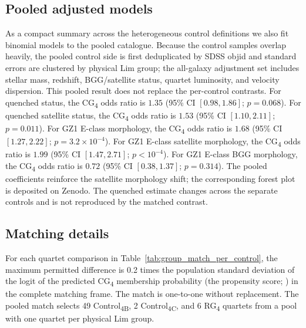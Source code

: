 \documentclass{aa}
\newcommand{\CB}{Control\textsubscript{4B}}
\newcommand{\CC}{Control\textsubscript{4C}}
\newcommand{\CG}{CG\textsubscript{4}}
\newcommand{\RG}{RG\textsubscript{4}}
\begin{document}
\begin{appendix}
\subsection{Pooled adjusted models}\label{app:pooled_adjusted}

As a compact summary across the heterogeneous control definitions we also fit binomial models to the pooled catalogue. Because the control samples overlap heavily, the pooled control side is first deduplicated by SDSS objid and standard errors are clustered by physical Lim group; the all-galaxy adjustment set includes stellar mass, redshift, BGG/satellite status, quartet luminosity, and velocity dispersion. This pooled result does not replace the per-control contrasts. For quenched status, the \CG{} odds ratio is \(1.35\) (95\% CI \([0.98, 1.86]\); \(p = 0.068\)). For quenched satellite status, the \CG{} odds ratio is \(1.53\) (95\% CI \([1.10, 2.11]\); \(p = 0.011\)). For GZ1 E-class morphology, the \CG{} odds ratio is \(1.68\) (95\% CI \([1.27, 2.22]\); \(p = 3.2\times 10^{-4}\)). For GZ1 E-class satellite morphology, the \CG{} odds ratio is \(1.99\) (95\% CI \([1.47, 2.71]\); \(p<10^{-4}\)). For GZ1 E-class BGG morphology, the \CG{} odds ratio is \(0.72\) (95\% CI \([0.38, 1.37]\); \(p = 0.314\)). The pooled coefficients reinforce the satellite morphology shift; the corresponding forest plot is deposited on Zenodo. The quenched estimate changes across the separate controls and is not reproduced by the matched contrast.


\subsection{Matching details}\label{app:matching_details}
For each quartet comparison in Table~\ref{tab:group_match_per_control}, the maximum permitted difference is 0.2 times the population standard deviation of the logit of the predicted \CG{} membership probability (the propensity score; \citealt{RosenbaumRubin1983,Austin2011}) in the complete matching frame. The match is one-to-one without replacement. The pooled match selects 49 \CB{}, 2 \CC{}, and 6 \RG{} quartets from a pool with one quartet per physical Lim group.



\end{appendix}
\end{document}
